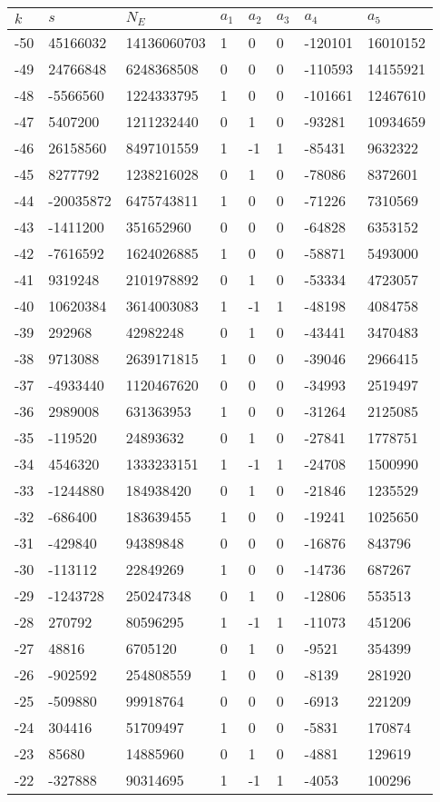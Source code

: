 \documentclass{amsart}
\begin{document}
\begin{longtable}{|l|l|l|lllll|}
\hline
$k$ & $s$ & $N_E$ & $a_1$ & $a_2$ & $a_3$ & $a_4$ & $a_5$\\
\hline
-50&45166032&14136060703&1&0&0&-120101&16010152\\
-49&24766848&6248368508&0&0&0&-110593&14155921\\
-48&-5566560&1224333795&1&0&0&-101661&12467610\\
-47&5407200&1211232440&0&1&0&-93281&10934659\\
-46&26158560&8497101559&1&-1&1&-85431&9632322\\
-45&8277792&1238216028&0&1&0&-78086&8372601\\
-44&-20035872&6475743811&1&0&0&-71226&7310569\\
-43&-1411200&351652960&0&0&0&-64828&6353152\\
-42&-7616592&1624026885&1&0&0&-58871&5493000\\
-41&9319248&2101978892&0&1&0&-53334&4723057\\
-40&10620384&3614003083&1&-1&1&-48198&4084758\\
-39&292968&42982248&0&1&0&-43441&3470483\\
-38&9713088&2639171815&1&0&0&-39046&2966415\\
-37&-4933440&1120467620&0&0&0&-34993&2519497\\
-36&2989008&631363953&1&0&0&-31264&2125085\\
-35&-119520&24893632&0&1&0&-27841&1778751\\
-34&4546320&1333233151&1&-1&1&-24708&1500990\\
-33&-1244880&184938420&0&1&0&-21846&1235529\\
-32&-686400&183639455&1&0&0&-19241&1025650\\
-31&-429840&94389848&0&0&0&-16876&843796\\
-30&-113112&22849269&1&0&0&-14736&687267\\
-29&-1243728&250247348&0&1&0&-12806&553513\\
-28&270792&80596295&1&-1&1&-11073&451206\\
-27&48816&6705120&0&1&0&-9521&354399\\
-26&-902592&254808559&1&0&0&-8139&281920\\
-25&-509880&99918764&0&0&0&-6913&221209\\
-24&304416&51709497&1&0&0&-5831&170874\\
-23&85680&14885960&0&1&0&-4881&129619\\
-22&-327888&90314695&1&-1&1&-4053&100296\\

\end{longtable}
\end{document}
